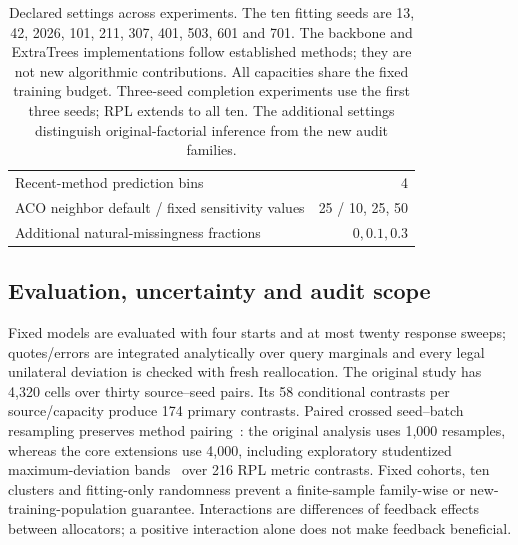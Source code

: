 \documentclass[11pt]{article}
\begin{document}
\begin{table}[htbp]
\begin{tabular}{lr}
Recent-method prediction bins & 4\\
ACO neighbor default / fixed sensitivity values & 25 / 10, 25, 50\\
Additional natural-missingness fractions & $0,0.1,0.3$\\\bottomrule
\end{tabular}
\caption{Declared settings across experiments. The ten fitting seeds are
13, 42, 2026, 101, 211, 307, 401, 503, 601 and 701. The backbone and
ExtraTrees implementations follow established methods; they are not new
algorithmic contributions. All capacities share the fixed training budget. Three-seed completion experiments use the first three seeds; RPL extends to all ten. The additional settings distinguish original-factorial inference from the new audit families.}
\label{tab:settings}\end{table}
\subsection{Evaluation, uncertainty and audit scope}
Fixed models are evaluated with four starts and at most twenty response sweeps;
quotes/errors are integrated analytically over query marginals and every legal
unilateral deviation is checked with fresh reallocation. The original study
has 4,320 cells over thirty source--seed pairs. Its 58 conditional contrasts
per source/capacity produce 174 primary contrasts. Paired crossed seed--batch
resampling preserves method pairing~\cite{pigeonhole}: the original analysis
uses 1,000 resamples, whereas the core extensions use 4,000, including
exploratory studentized maximum-deviation bands~\cite{romanowolf} over 216
RPL metric contrasts. Fixed cohorts, ten clusters and fitting-only randomness
prevent a finite-sample family-wise or new-training-population guarantee.
Interactions are differences of feedback effects between allocators; a positive
interaction alone does not make feedback beneficial.
\end{document}
